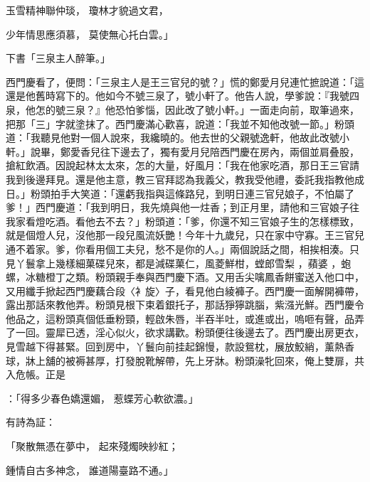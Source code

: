 \begin{showcontents}{}
玉雪精神聯仲琰，  瓊林才貌過文君，

少年情思應須慕，  莫使無心托白雲。」

下書「三泉主人醉筆。」

西門慶看了，便問：「三泉主人是王三官兒的號？」慌的鄭愛月兒連忙摭說道：「這還是他舊時寫下的。他如今不號三泉了，號小軒了。他告人說，學爹說：『我號四泉，他怎的號三泉？』他恐怕爹惱，因此改了號小軒。」一面走向前，取筆過來，把那「三」字就塗抹了。西門慶滿心歡喜，說道：「我並不知他改號一節。」粉頭道：「我聽見他對一個人說來，我纔曉的。他去世的父親號逸軒，他故此改號小軒。」說畢，鄭愛香兒往下邊去了，獨有愛月兒陪西門慶在房內，兩個並肩叠股，搶紅飲酒。因說起林太太來，怎的大量，好風月：「我在他家吃酒，那日王三官請我到後邊拜見。還是他主意，教三官拜認為我義父，教我受他禮，委託我指教他成日。」粉頭拍手大笑道：「還虧我指與這條路兒，到明日連三官兒娘子，不怕屬了爹！」西門慶道：「我到明日，我先燒與他一炷香；到正月里，請他和三官娘子往我家看燈吃酒。看他去不去？」粉頭道：「爹，你還不知三官娘子生的怎樣標致，就是個燈人兒，沒他那一段兒風流妖艷！今年十九歲兒，只在家中守寡。王三官兒通不着家。爹，你看用個工夫兒，愁不是你的人。」兩個說話之間，相挨相湊。只見丫鬟拿上幾樣細菓碟兒來，都是減碟菓仁，風菱鮮柑，螳郎雪梨 ，蘋婆 ，蚫螺，冰糖橙丁之類。粉頭親手奉與西門慶下酒。又用舌尖噙鳳香餅蜜送入他口中，又用纖手掀起西門慶藕合段〈衤旋〉子，看見他白綾褲子。西門慶一面解開褲帶，露出那話來教他弄。粉頭見根下束着銀托子，那話猙獰跳腦，紫漒光鮮。西門慶令他品之，這粉頭真個低垂粉頸，輕啟朱唇，半吞半吐，或進或出，嗚咂有聲，品弄了一回。靈犀已透，淫心似火，欲求講歡。粉頭便往後邊去了。西門慶出房更衣，見雪越下得甚緊。回到房中，丫鬟向前挂起錦慢，款設鴛枕，展放鮫綃，薰熱香球，牀上舖的被褥甚厚，打發脫靴解帶，先上牙牀。粉頭澡牝回來，俺上雙扉，共入危帳。正是

：「得多少春色嬌還媚， 惹蝶芳心軟欲濃。」

有詩為証：

「聚散無憑在夢中，  起來殘燭映紗紅；

鍾情自古多神念，  誰道陽臺路不通。」


\end{showcontents}
